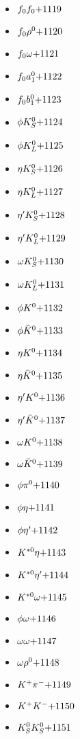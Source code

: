 \begin{multicols}{3}
\begin{itemize}
 \item $ f_{0} f_{0} \hfill{+1119}$
 \item $ f_{0} \rho^{0} \hfill{+1120}$
 \item $ f_{0} \omega \hfill{+1121}$
 \item $ f_{0} a_{1}^{0} \hfill{+1122}$
 \item $ f_{0} b_{1}^{0} \hfill{+1123}$
 \item $ \phi K_{S}^{0} \hfill{+1124}$
 \item $ \phi K_{L}^{0} \hfill{+1125}$
 \item $ \eta K_{S}^{0} \hfill{+1126}$
 \item $ \eta K_{L}^{0} \hfill{+1127}$
 \item $ {\eta^{\prime}} K_{S}^{0} \hfill{+1128}$
 \item $ {\eta^{\prime}} K_{L}^{0} \hfill{+1129}$
 \item $ \omega K_{S}^{0} \hfill{+1130}$
 \item $ \omega K_{L}^{0} \hfill{+1131}$
 \item $ \phi K^{0} \hfill{+1132}$
 \item $ \phi \bar{K}^{0} \hfill{+1133}$
 \item $ \eta K^{0} \hfill{+1134}$
 \item $ \eta \bar{K}^{0} \hfill{+1135}$
 \item $ {\eta^{\prime}} K^{0} \hfill{+1136}$
 \item $ {\eta^{\prime}} \bar{K}^{0} \hfill{+1137}$
 \item $ \omega K^{0} \hfill{+1138}$
 \item $ \omega \bar{K}^{0} \hfill{+1139}$
 \item $ \phi \pi^{0} \hfill{+1140}$
 \item $ \phi \eta \hfill{+1141}$
 \item $ \phi {\eta^{\prime}} \hfill{+1142}$
 \item $ K^{*0} \eta \hfill{+1143}$
 \item $ K^{*0} {\eta^{\prime}} \hfill{+1144}$
 \item $ K^{*0} \omega \hfill{+1145}$
 \item $ \phi \omega \hfill{+1146}$
 \item $ \omega \omega \hfill{+1147}$
 \item $ \omega \rho^{0} \hfill{+1148}$
 \item $ K^{+} \pi^{-} \hfill{+1149}$
 \item $ K^{+} K^{-} \hfill{+1150}$
 \item $ K_{S}^{0} K_{S}^{0} \hfill{+1151}$

\end{itemize}
\end{multicols}

